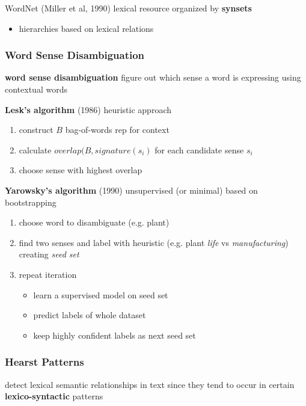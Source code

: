 \documentclass[]{article}
\theoremstyle{definition}
\begin{document}
WordNet (Miller et al, 1990) lexical resource organized by \textbf{synsets}
\begin{itemize}
    \item hierarchies based on lexical relations
\end{itemize}

\subsubsection{Word Sense Disambiguation}%
\label{ssub:word_sense_disambiguation}

\textbf{word sense disambiguation} figure out which sense a word is expressing using contextual words

\textbf{Lesk's algorithm} (1986) heuristic approach
\begin{enumerate}
    \item construct $B$ bag-of-words rep for context
    \item calculate $overlap(B, signature(s_i)$ for each candidate sense $s_i$
    \item choose sense with highest overlap
\end{enumerate}

\textbf{Yarowsky's algorithm} (1990) unsupervised (or minimal) based on bootstrapping
\begin{enumerate}
    \item choose word to disambiguate (e.g. plant)
    \item find two senses and label with heuristic (e.g. plant \textit{life} vs \textit{manufacturing}) creating \textit{seed set}
    \item repeat iteration
        \begin{itemize}
            \item learn a supervised model on seed set
            \item predict labels of whole dataset
            \item keep highly confident labels as next seed set
        \end{itemize}
\end{enumerate}

\subsubsection{Hearst Patterns}%
\label{ssub:hearst_patterns}

detect lexical semantic relationships in text since they tend to occur in certain \textbf{lexico-syntactic} patterns
\end{document}
